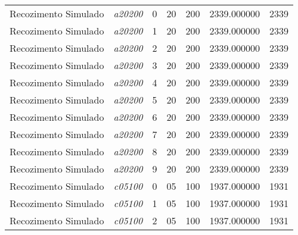 {\begin{longtable}{cc|c|cc|cc}
			Recozimento Simulado & \textit{a20200}    & 0                               & 20               & 200              & 2339.000000                          & 2339 \\ 
			Recozimento Simulado & \textit{a20200}    & 1                               & 20               & 200              & 2339.000000                          & 2339 \\ 
			Recozimento Simulado & \textit{a20200}    & 2                               & 20               & 200              & 2339.000000                          & 2339 \\ 
			Recozimento Simulado & \textit{a20200}    & 3                               & 20               & 200              & 2339.000000                          & 2339 \\ 
			Recozimento Simulado & \textit{a20200}    & 4                               & 20               & 200              & 2339.000000                          & 2339 \\ 
			Recozimento Simulado & \textit{a20200}    & 5                               & 20               & 200              & 2339.000000                          & 2339 \\ 
			Recozimento Simulado & \textit{a20200}    & 6                               & 20               & 200              & 2339.000000                          & 2339 \\ 
			Recozimento Simulado & \textit{a20200}    & 7                               & 20               & 200              & 2339.000000                          & 2339 \\ 
			Recozimento Simulado & \textit{a20200}    & 8                               & 20               & 200              & 2339.000000                          & 2339 \\ 
			Recozimento Simulado & \textit{a20200}    & 9                               & 20               & 200              & 2339.000000                          & 2339 \\ \hline
			Recozimento Simulado & \textit{c05100}    & 0                               & 05               & 100              & 1937.000000                          & 1931 \\ 
			Recozimento Simulado & \textit{c05100}    & 1                               & 05               & 100              & 1937.000000                          & 1931 \\ 
			Recozimento Simulado & \textit{c05100}    & 2                               & 05               & 100              & 1937.000000                          & 1931 \\ 

\end{longtable}}
